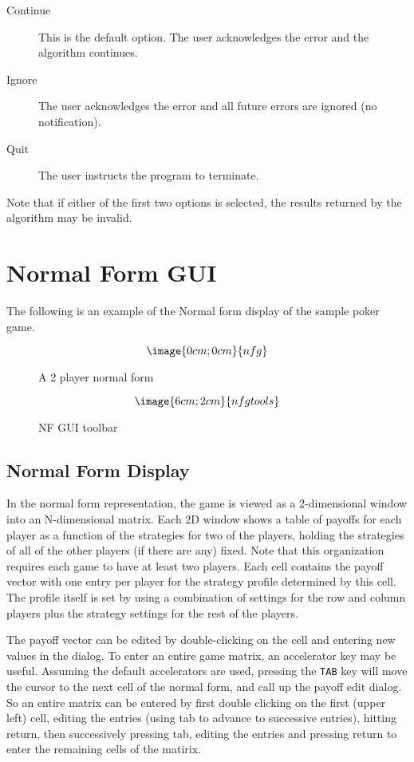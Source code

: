\begin{description}
\item[Continue] This is the default option.  The user acknowledges the
error and the algorithm continues.
\item[Ignore] The user acknowledges the error and all future errors
are ignored (no notification).
\item[Quit] The user instructs the program to terminate.
\end{description}

Note that if either of the first two options is selected, the results 
returned by the algorithm may be invalid.

\chapter{Normal Form GUI}\label{NFGUI}

The following is an example of the Normal form display of the sample
poker game.

\begin{figure}
$$\image{0cm;0cm}{nfg}$$
\caption{A 2 player normal form}\label{fig_nfg}
\end{figure}

\begin{figure}
$$\image{6cm;2cm}{nfgtools}$$
\caption{NF GUI toolbar}\label{fig_nfgtools}
\end{figure}

\section{Normal Form Display}

In the normal form representation, the game is viewed as a
2-dimensional window into an N-dimensional matrix.  Each 2D window
shows a table of payoffs for each player as a function of the
strategies for two of the players, holding the strategies of all of
the other players (if there are any) fixed.  Note that this
organization requires each game to have at least two players.  Each
cell contains the payoff vector with one entry per player for the
strategy profile determined by this cell.  The profile itself is set
by using a combination of settings for the row and column players plus
the strategy settings for the rest of the players.  

The payoff vector can be edited by double-clicking on the cell and
entering new values in the dialog. To enter an entire game matrix, an
accelerator key may be useful.  Assuming the default accelerators are
used, pressing the {\tt TAB} key will move the cursor to the next cell
of the normal form, and call up the payoff edit dialog. So an entire
matrix can be entered by first double clicking on the first (upper
left) cell, editing the entries (using tab to advance to successive
entries), hitting return, then successively pressing tab, editing the
entries and pressing return to enter the remaining cells of the
matirix.

